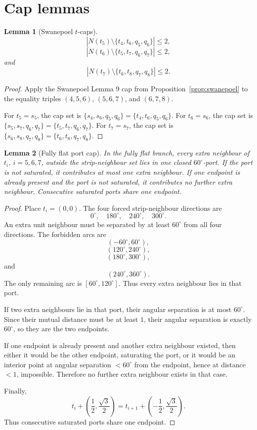 \documentclass[11pt]{article}
\newtheorem{lemma}{Lemma}
\begin{document}
\section{Cap lemmas}

\begin{lemma}[Swanepoel $t$-caps]\label{lem:t-caps}
\[
  |N(t_5)\setminus\{t_4,t_6,q_5,q_6\}|\le2,
\]
\[
  |N(t_6)\setminus\{t_5,t_7,q_6,q_7\}|\le2,
\]
and
\[
  |N(t_7)\setminus\{t_6,t_8,q_7,q_8\}|\le2.
\]
\end{lemma}

\begin{proof}
Apply the Swanepoel Lemma 9 cap from Proposition~\ref{prop:swanepoel} to the equality triples $(4,5,6)$, $(5,6,7)$, and $(6,7,8)$.

For $t_5=s_5$, the cap set is $\{s_4,s_6,q_5,q_6\}=\{t_4,t_6,q_5,q_6\}$.
For $t_6=s_6$, the cap set is $\{s_5,s_7,q_6,q_7\}=\{t_5,t_7,q_6,q_7\}$.
For $t_7=s_7$, the cap set is $\{s_6,s_8,q_7,q_8\}=\{t_6,t_8,q_7,q_8\}$.
\end{proof}

\begin{lemma}[Fully flat port cap]\label{lem:flat-port}
In the fully flat branch, every extra neighbour of $t_i$, $i=5,6,7$, outside the strip-neighbour set lies in one closed $60^\circ$-port. If the port is not saturated, it contributes at most one extra neighbour. If one endpoint is already present and the port is not saturated, it contributes no further extra neighbour. Consecutive saturated ports share one endpoint.
\end{lemma}

\begin{proof}
Place $t_i=(0,0)$. The four forced strip-neighbour directions are
\[
  0^\circ,
  \quad 180^\circ,
  \quad 240^\circ,
  \quad 300^\circ.
\]
An extra unit neighbour must be separated by at least $60^\circ$ from all four directions. The forbidden arcs are
\[
  (-60^\circ,60^\circ),
\]
\[
  (120^\circ,240^\circ),
\]
\[
  (180^\circ,300^\circ),
\]
and
\[
  (240^\circ,360^\circ).
\]
The only remaining arc is $[60^\circ,120^\circ]$. Thus every extra neighbour lies in that port.

If two extra neighbours lie in that port, their angular separation is at most $60^\circ$. Since their mutual distance must be at least $1$, their angular separation is exactly $60^\circ$, so they are the two endpoints.

If one endpoint is already present and another extra neighbour existed, then either it would be the other endpoint, saturating the port, or it would be an interior point at angular separation $<60^\circ$ from the endpoint, hence at distance $<1$, impossible. Therefore no further extra neighbour exists in that case.

Finally,
\[
  t_i+\left(\frac12,\frac{\sqrt3}{2}\right)=t_{i+1}+\left(-\frac12,\frac{\sqrt3}{2}\right).
\]
Thus consecutive saturated ports share one endpoint.
\end{proof}
\end{document}
